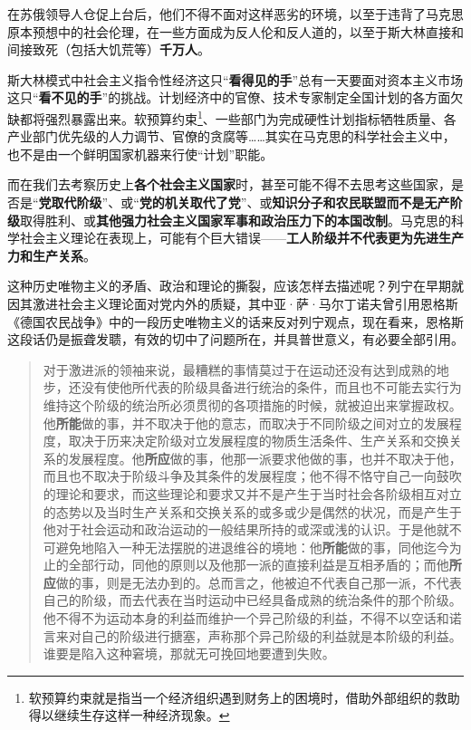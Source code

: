 在苏俄领导人仓促上台后，他们不得不面对这样恶劣的环境，以至于违背了马克思原本预想中的社会伦理，在一些方面成为反人伦和反人道的，以至于斯大林直接和间接致死（包括大饥荒等）\textbf{千万人}。

斯大林模式中社会主义指令性经济这只“\textbf{看得见的手}”总有一天要面对资本主义市场这只“\textbf{看不见的手}”的挑战。计划经济中的官僚、技术专家制定全国计划的各方面欠缺都将强烈暴露出来。软预算约束\footnote{软预算约束就是指当一个经济组织遇到财务上的困境时，借助外部组织的救助得以继续生存这样一种经济现象。}、一些部门为完成硬性计划指标牺牲质量、各产业部门优先级的人力调节、官僚的贪腐等……其实在马克思的科学社会主义中，也不是由一个鲜明国家机器来行使“计划”职能。

而在我们去考察历史上\textbf{各个社会主义国家}时，甚至可能不得不去思考这些国家，是否是“\textbf{党取代阶级}”、或“\textbf{党的机关取代了党}”、或\textbf{知识分子和农民联盟而不是无产阶级}取得胜利、或\textbf{其他强力社会主义国家军事和政治压力下的本国改制}。马克思的科学社会主义理论在表现上，可能有个巨大错误——\textbf{工人阶级并不代表更为先进生产力和生产关系}。

这种历史唯物主义的矛盾、政治和理论的撕裂，应该怎样去描述呢？列宁在早期就因其激进社会主义理论面对党内外的质疑，其中亚·萨·马尔丁诺夫曾引用恩格斯《德国农民战争》中的一段历史唯物主义的话来反对列宁观点，现在看来，恩格斯这段话仍是振聋发聩，有效的切中了问题所在，并具普世意义，有必要全部引用。

\begin{quotation}
  对于激进派的领袖来说，最糟糕的事情莫过于在运动还没有达到成熟的地步，还没有使他所代表的阶级具备进行统治的条件，而且也不可能去实行为维持这个阶级的统治所必须贯彻的各项措施的时候，就被迫出来掌握政权。他\textbf{所能}做的事，并不取决于他的意志，而取决于不同阶级之间对立的发展程度，取决于历来决定阶级对立发展程度的物质生活条件、生产关系和交换关系的发展程度。他\textbf{所应}做的事，他那一派要求他做的事，也并不取决于他，而且也不取决于阶级斗争及其条件的发展程度；他不得不恪守自己一向鼓吹的理论和要求，而这些理论和要求又并不是产生于当时社会各阶级相互对立的态势以及当时生产关系和交换关系的或多或少是偶然的状况，而是产生于他对于社会运动和政治运动的一般结果所持的或深或浅的认识。于是他就不可避免地陷入一种无法摆脱的进退维谷的境地：他\textbf{所能}做的事，同他迄今为止的全部行动，同他的原则以及他那一派的直接利益是互相矛盾的；而他\textbf{所应}做的事，则是无法办到的。总而言之，他被迫不代表自己那一派，不代表自己的阶级，而去代表在当时运动中已经具备成熟的统治条件的那个阶级。他不得不为运动本身的利益而维护一个异己阶级的利益，不得不以空话和诺言来对自己的阶级进行搪塞，声称那个异己阶级的利益就是本阶级的利益。谁要是陷入这种窘境，那就无可挽回地要遭到失败。
\end{quotation}

